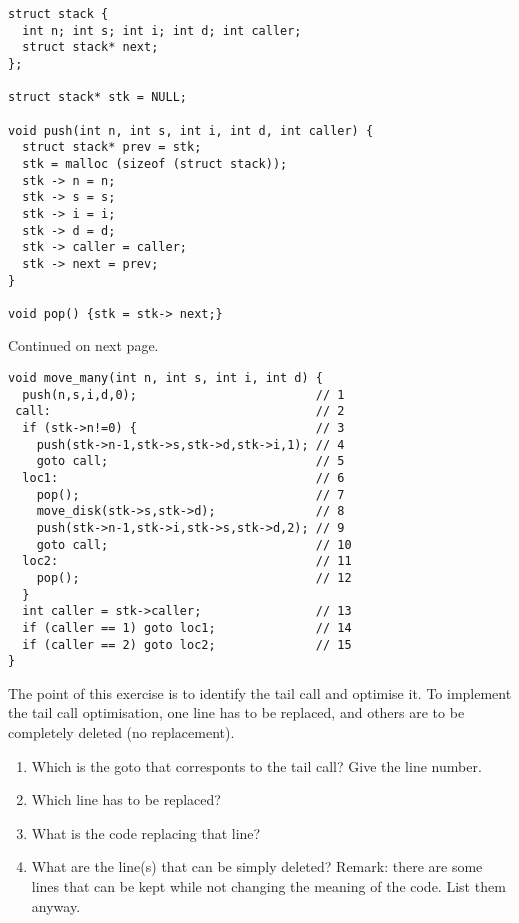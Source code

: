 \documentclass{article}
\begin{document}
\begin{verbatim}
struct stack {
  int n; int s; int i; int d; int caller;
  struct stack* next;
};

struct stack* stk = NULL;

void push(int n, int s, int i, int d, int caller) {
  struct stack* prev = stk;
  stk = malloc (sizeof (struct stack));
  stk -> n = n;
  stk -> s = s;
  stk -> i = i;
  stk -> d = d;
  stk -> caller = caller;
  stk -> next = prev;
}

void pop() {stk = stk-> next;}

\end{verbatim}
Continued on next page.
\newpage
\begin{verbatim}
void move_many(int n, int s, int i, int d) {
  push(n,s,i,d,0);                         // 1
 call:                                     // 2
  if (stk->n!=0) {                         // 3
    push(stk->n-1,stk->s,stk->d,stk->i,1); // 4
    goto call;                             // 5
  loc1:                                    // 6
    pop();                                 // 7
    move_disk(stk->s,stk->d);              // 8
    push(stk->n-1,stk->i,stk->s,stk->d,2); // 9
    goto call;                             // 10
  loc2:                                    // 11
    pop();                                 // 12
  }
  int caller = stk->caller;                // 13
  if (caller == 1) goto loc1;              // 14
  if (caller == 2) goto loc2;              // 15
}
\end{verbatim}

The point of this exercise is to identify the tail call and optimise
it. To implement the tail call optimisation, one line has to be
replaced, and others are to be completely deleted (no replacement).

\begin{enumerate}
\item Which is the goto that corresponts to the tail call? Give the
  line number.

\item Which line has to be replaced? 
\item What is the code replacing that line? 
\item What are the line(s) that can be simply deleted? Remark: there
  are some lines that can be kept while not changing the meaning of
  the code. List them anyway.  

\end{enumerate}
\end{document}
